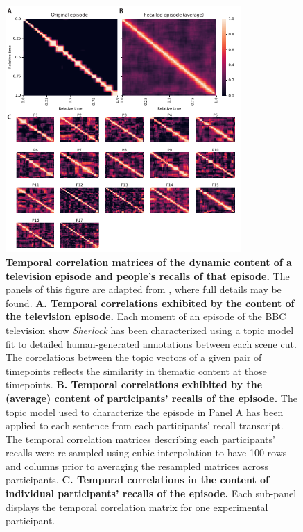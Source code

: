 \documentclass{article}
\providecommand{\DIFaddbeginFL}{} %
\providecommand{\DIFaddendFL}{} %
\providecommand{\DIFdelbeginFL}{} %
\providecommand{\DIFdelendFL}{} %
\newcommand{\DIFscaledelfig}{0.5}
\newlength{\DIFdelgraphicswidth} %
\newlength{\DIFdelgraphicsheight} %
\newcommand{\DIFaddincludegraphics}[2][]{{\color{blue}\fbox{\DIFOincludegraphics[#1]{#2}}}} %
\newcommand{\DIFdelincludegraphics}[2][]{%
\sbox{\DIFdelgraphicsbox}{\DIFOincludegraphics[#1]{#2}}%
\settoboxwidth{\DIFdelgraphicswidth}{\DIFdelgraphicsbox} %
\settoboxtotalheight{\DIFdelgraphicsheight}{\DIFdelgraphicsbox} %
\scalebox{\DIFscaledelfig}{%
\parbox[b]{\DIFdelgraphicswidth}{\usebox{\DIFdelgraphicsbox}\\[-\baselineskip] \rule{\DIFdelgraphicswidth}{0em}}\llap{\resizebox{\DIFdelgraphicswidth}{\DIFdelgraphicsheight}{%
\setlength{\unitlength}{\DIFdelgraphicswidth}%
\begin{picture}(1,1)%
\thicklines\linethickness{2pt} %
{\color[rgb]{1,0,0}\put(0,0){\framebox(1,1){}}}%
{\color[rgb]{1,0,0}\put(0,0){\line( 1,1){1}}}%
{\color[rgb]{1,0,0}\put(0,1){\line(1,-1){1}}}%
\end{picture}%
}\hspace*{3pt}}} %
} %
\DeclareRobustCommand{\DIFaddbeginFL}{\DIFOaddbeginFL \let\includegraphics\DIFaddincludegraphics} %
\DeclareRobustCommand{\DIFaddendFL}{\DIFOaddendFL \let\includegraphics\DIFOincludegraphics} %
\DeclareRobustCommand{\DIFdelbeginFL}{\DIFOdelbeginFL \let\includegraphics\DIFdelincludegraphics} %
\DeclareRobustCommand{\DIFdelendFL}{\DIFOaddendFL \let\includegraphics\DIFOincludegraphics} %
\begin{document}
\begin{figure}[tp] \centering \DIFdelbeginFL %
\DIFdelendFL \DIFaddbeginFL \includegraphics[width=0.8\textwidth]{figs/pres_rec_corrmats_sherlock} \DIFaddendFL \caption{\textbf{Temporal correlation matrices of the dynamic content of a television episode and people's recalls of that episode.}  The panels of this figure are adapted from \cite{HeusEtal18c}, where full details may be found. \textbf{A. Temporal correlations exhibited by the content of the television episode.}  Each moment of an episode of the BBC television show \textit{Sherlock} has been characterized using a topic model~\citep{BleiEtal03} fit to detailed human-generated annotations between each scene cut.  The correlations between the topic vectors of a given pair of timepoints reflects the similarity in thematic content at those timepoints.  \textbf{B. Temporal correlations exhibited by the (average) content of participants' recalls of the episode.} The topic model used to characterize the episode in Panel A has been applied to each sentence from each participants' recall transcript.  The temporal correlation matrices describing each participants' recalls were re-sampled using cubic interpolation to have 100 rows and columns prior to averaging the resampled matrices across participants.  \textbf{C. Temporal correlations in the content of individual participants' recalls of the episode.} Each sub-panel displays the temporal correlation matrix for one experimental participant.}
\label{fig:corrmats}
\end{figure}
\end{document}
